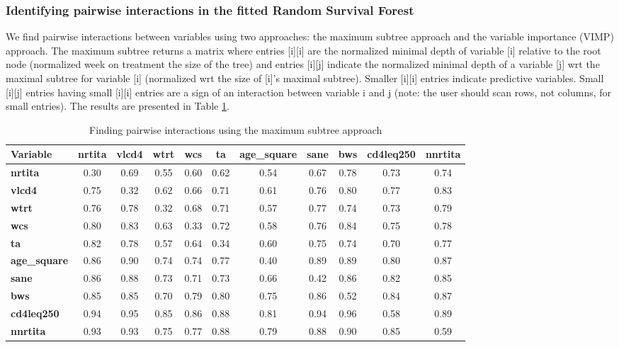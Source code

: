 \documentclass[10pt]{NSP1}
\begin{document}
\subsubsection{Identifying pairwise interactions in the fitted Random Survival Forest }
We find pairwise interactions between variables using two approaches: the maximum subtree approach and the variable importance (VIMP) approach. The maximum subtree returns a matrix where entries [i][i] are the normalized minimal depth of variable [i] relative to the root node (normalized week on treatment the size of the tree) and entries [i][j] indicate the normalized minimal depth of a variable [j] wrt the maximal subtree for variable [i] (normalized wrt the size of [i]’s maximal subtree). Smaller [i][i] entries indicate predictive variables. Small [i][j] entries having small [i][i] entries are a sign of an interaction between variable i and j (note: the user should scan rows, not columns, for small entries). The results are presented in Table \ref{tab:pairwise_interactions}.

\begin{table}[t]  %
\centering
\scriptsize  %
\caption{Finding pairwise interactions using the maximum subtree approach}
\label{tab:pairwise_interactions}
\begin{tabular}{@{}l*{10}{c}@{}}
\toprule
\textbf{Variable} & \textbf{nrtita} & \textbf{vlcd4} & \textbf{wtrt} & \textbf{wcs} & \textbf{ta} & \textbf{age\_square} & \textbf{sane} & \textbf{bws} & \textbf{cd4leq250} & \textbf{nnrtita} \\
\midrule
\textbf{nrtita} & 0.30 & 0.69 & 0.55 & 0.60 & 0.62 & 0.54 & 0.67 & 0.78 & 0.73 & 0.74 \\
\textbf{vlcd4} & 0.75 & 0.32 & 0.62 & 0.66 & 0.71 & 0.61 & 0.76 & 0.80 & 0.77 & 0.83 \\
\textbf{wtrt} & 0.76 & 0.78 & 0.32 & 0.68 & 0.71 & 0.57 & 0.77 & 0.74 & 0.73 & 0.79 \\
\textbf{wcs} & 0.80 & 0.83 & 0.63 & 0.33 & 0.72 & 0.58 & 0.76 & 0.84 & 0.75 & 0.78 \\
\textbf{ta} & 0.82 & 0.78 & 0.57 & 0.64 & 0.34 & 0.60 & 0.75 & 0.74 & 0.70 & 0.77 \\
\textbf{age\_square} & 0.86 & 0.90 & 0.74 & 0.74 & 0.77 & 0.40 & 0.89 & 0.89 & 0.80 & 0.87 \\
\textbf{sane} & 0.86 & 0.88 & 0.73 & 0.71 & 0.73 & 0.66 & 0.42 & 0.86 & 0.82 & 0.85 \\
\textbf{bws} & 0.85 & 0.85 & 0.70 & 0.79 & 0.80 & 0.75 & 0.86 & 0.52 & 0.84 & 0.87 \\
\textbf{cd4leq250} & 0.94 & 0.95 & 0.85 & 0.86 & 0.88 & 0.81 & 0.94 & 0.96 & 0.58 & 0.89 \\
\textbf{nnrtita} & 0.93 & 0.93 & 0.75 & 0.77 & 0.88 & 0.79 & 0.88 & 0.90 & 0.85 & 0.59 \\
\bottomrule
\end{tabular}
\end{table}
\end{document}
